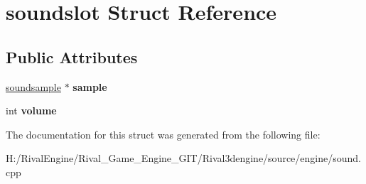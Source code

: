 \hypertarget{structsoundslot}{}\section{soundslot Struct Reference}
\label{structsoundslot}
\subsection*{Public Attributes}
\begin{DoxyCompactItemize}
\item 
\mbox{\label{structsoundslot_adab7597a16a2c549f6f51ed38b707411}} 
\hyperlink{structsoundsample}{soundsample} $\ast$ {\bfseries sample}
\item 
\mbox{\label{structsoundslot_a7904df83e40d36405184d65c0303c89a}} 
int {\bfseries volume}
\end{DoxyCompactItemize}


The documentation for this struct was generated from the following file\+:\begin{DoxyCompactItemize}
\item 
H\+:/\+Rival\+Engine/\+Rival\+\_\+\+Game\+\_\+\+Engine\+\_\+\+G\+I\+T/\+Rival3dengine/source/engine/sound.\+cpp\end{DoxyCompactItemize}
